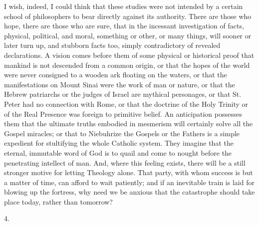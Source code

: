 I wish, indeed, I could think that these studies were not intended
by a certain school of philosophers to bear directly against its
authority. There are those who hope, there are those who are sure,
that in the incessant investigation of facts, physical, political, and
moral, something or other, or many things, will sooner or later turn
up, and stubborn facts too, simply contradictory of revealed
declarations. A vision comes before them of some physical or
historical proof that mankind is not descended from a common origin,
or that the hopes of the world were never consigned to a wooden ark
floating on the waters, or that the manifestations on Mount Sinai were
the work of man or nature, or that the Hebrew patriarchs or the
judges of Israel are mythical personages, or that St. Peter had no
connection with Rome, or that the doctrine of the Holy Trinity or of
the Real Presence was foreign to primitive belief. An anticipation
possesses them that the ultimate truths embodied in mesmerism will
certainly solve all the Gospel miracles; or that to Niebuhrize the
Gospels or the Fathers is a simple expedient for stultifying the whole
Catholic system. They imagine that the eternal, immutable word of God
is to quail and come to nought before the penetrating intellect of
man. And, where this feeling exists, there will be a still stronger
motive for letting Theology alone. That party, with whom success is
but a matter of time, can afford to wait patiently; and if an
inevitable train is laid for blowing up the fortress, why need we be
anxious that the catastrophe should take place today, rather than
tomorrow?

4.

